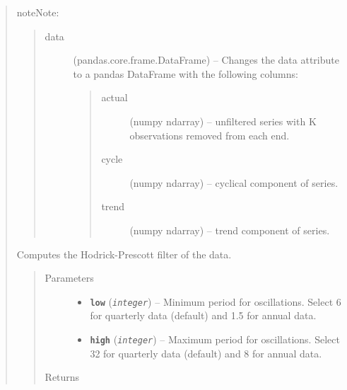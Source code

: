 \documentclass[letterpaper,10pt,english]{sphinxmanual}
\begin{document}
\begin{fulllineitems}
\begin{quote}
\begin{fulllineitems}
\begin{notice}{note}{Note:}
\begin{quote}
\begin{description}
\item[{data}] \leavevmode
(pandas.core.frame.DataFrame) --  Changes the data attribute to a pandas DataFrame with the following columns:
\begin{quote}\begin{description}
\item[{actual}] \leavevmode
(numpy ndarray) -- unfiltered series with K observations removed from each end.

\item[{cycle}] \leavevmode
(numpy ndarray) --  cyclical component of series.

\item[{trend}] \leavevmode
(numpy ndarray) --  trend component of series.

\end{description}\end{quote}

\end{description}\end{quote}
\end{notice}

\end{fulllineitems}


\begin{fulllineitems}
\label{series_class:fredpy.series.cffilter}
Computes the Hodrick-Prescott filter of the data.
\begin{quote}\begin{description}
\item[{Parameters}] \leavevmode\begin{itemize}
\item {} 
\textbf{\texttt{low}} (\emph{\texttt{integer}}) -- Minimum period for oscillations. Select 6 for quarterly data (default) and 1.5 for annual data.

\item {} 
\textbf{\texttt{high}} (\emph{\texttt{integer}}) -- Maximum period for oscillations. Select 32 for quarterly data (default) and 8 for annual data.

\end{itemize}

\item[{Returns}] \leavevmode
{\hyperref[series_class:fredpy.series]{}}

\end{description}\end{quote}


\end{fulllineitems}
\end{quote}
\end{fulllineitems}
\end{document}
